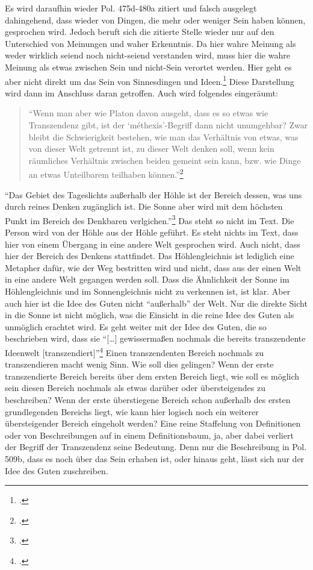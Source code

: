 \documentclass[12pt]{article}
\newcommand*{\zitatblock}[1]{%
    \begin{quote}
    \fontsize{10}{12}\selectfont
    \setlength{\parskip}{1.0em}
    #1
    \end{quote}
}
\begin{document}
Es wird daraufhin wieder Pol. 475d-480a zitiert und falsch ausgelegt dahingehend, dass wieder von Dingen, die mehr oder weniger Sein haben können, gesprochen wird. Jedoch beruft sich die zitierte Stelle wieder nur auf den Unterschied von Meinungen und waher Erkenntnis. Da hier wahre Meinung als weder wirklich seiend noch nicht-seiend verstanden wird, muss hier die wahre Meinung als etwas zwischen Sein und nicht-Sein verortet werden. Hier geht es aber nicht direkt um das Sein von Sinnesdingen und Ideen.\footcite[vgl.][S. 37f.]{DisseMetaphysik} Diese Darstellung wird dann im Anschluss daran getroffen.
Auch wird folgendes eingeräumt: \zitatblock{\enquote{Wenn man aber wie Platon davon ausgeht, dass es so etwas wie Transzendenz gibt, ist der \enquote{méthexis}-Begriff dann nicht unumgehbar? Zwar bleibt die Schwierigkeit bestehen, wie man das Verhältnis von etwas, was von dieser Welt getrennt ist, zu dieser Welt denken soll, wenn kein räumliches Verhältnis zwischen beiden gemeint sein kann, bzw. wie Dinge an etwas Unteilbarem teilhaben können.}\footcite[][S. 48]{DisseMetaphysik}}
\enquote{Das Gebiet des Tageslichts außerhalb der Höhle ist der Bereich dessen, was uns durch reines Denken zugänglich ist. Die Sonne aber wird mit dem höchsten Punkt im Bereich des Denkbaren verlgichen.}\footcite[][S. 49]{DisseMetaphysik} Das steht so nicht im Text. Die Person wird von der Höhle aus der Höhle geführt. Es steht nichts im Text, dass hier von einem Übergang in eine andere Welt gesprochen wird. Auch nicht, dass hier der Bereich des Denkens stattfindet. Das Höhlengleichnis ist lediglich eine Metapher dafür, wie der Weg bestritten wird und nicht, dass aus der einen Welt in eine andere Welt gegangen werden soll. Dass die Ähnlichkeit der Sonne im Höhlengleichnis und im Sonnengleichnis nicht zu verkennen ist, ist klar. Aber auch hier ist die Idee des Guten nicht \enquote{außerhalb} der Welt. Nur die direkte Sicht in die Sonne ist nicht möglich, was die Einsicht in die reine Idee des Guten als unmöglich erachtet wird. 
Es geht weiter mit der Idee des Guten, die so beschrieben wird, dass sie \enquote{[\dots] gewissermaßen nochmals die bereits transzendente Ideenwelt [transzendiert]}\footcite[vgl.][S. 50]{DisseMetaphysik}
Einen transzendenten Bereich nochmals zu transzendieren macht wenig Sinn. Wie soll dies gelingen? Wenn der erste transzendierte Bereich bereits über dem ersten Bereich liegt, wie soll es möglich sein diesen Bereich nochmals als etwas darüber oder übersteigendes zu beschreiben? Wenn der erste überstiegene Bereich schon außerhalb des ersten grundlegenden Bereichs liegt, wie kann hier logisch noch ein weiterer übersteigender Bereich eingeholt werden? Eine reine Staffelung von Definitionen oder von Beschreibungen auf in einem Definitionsbaum, ja, aber dabei verliert der Begriff der Transzendenz seine Bedeutung. Denn nur die Beschreibung in Pol. 509b, dass es noch über das Sein erhaben ist, oder hinaus geht, lässt sich nur der Idee des Guten zuschreiben. 
\end{document}
